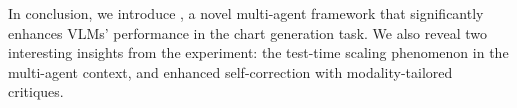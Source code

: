 
In conclusion, we introduce \model{}, a novel multi-agent framework that significantly enhances VLMs' performance in the chart generation task. We also reveal two interesting insights from the experiment: the test-time scaling phenomenon in the multi-agent context, and  enhanced self-correction with modality-tailored critiques.
